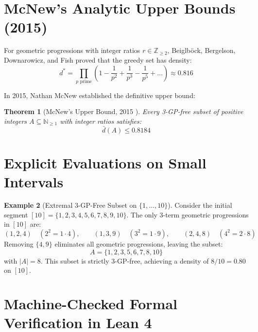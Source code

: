 \documentclass[11pt,a4paper]{article}
\newtheorem{theorem}{Theorem}[section]
\theoremstyle{definition}
\newtheorem{example}[theorem]{Example}
\begin{document}
\section{McNew's Analytic Upper Bounds (2015)}

For geometric progressions with integer ratios $r \in \mathbb{Z}_{\ge 2}$, Beiglb\"ock, Bergelson, Downarowicz, and Fish \cite{beiglbock2010} proved that the greedy set has density:
\[ d^* = \prod_{p \text{ prime}} \left( 1 - \frac{1}{p^2} + \frac{1}{p^3} - \frac{1}{p^5} + \dots \right) \approx 0.816 \]

In 2015, Nathan McNew \cite{mcnew2015} established the definitive upper bound:

\begin{theorem}[McNew's Upper Bound, 2015 \cite{mcnew2015}]\label{thm:mcnew_bound}
Every 3-GP-free subset of positive integers $A \subseteq \mathbb{N}_{\ge 1}$ with integer ratios satisfies:
\begin{equation}\label{eq:mcnew_density}
\bar{d}(A) \le 0.8184
\end{equation}
\end{theorem}

\section{Explicit Evaluations on Small Intervals}

\begin{example}[Extremal 3-GP-Free Subset on $\{1, \dots, 10\}$]\label{ex:small_gp_free}
Consider the initial segment $[10] = \{1, 2, 3, 4, 5, 6, 7, 8, 9, 10\}$.
The only 3-term geometric progressions in $[10]$ are:
\[ (1, 2, 4) \quad (2^2 = 1 \cdot 4), \qquad (1, 3, 9) \quad (3^2 = 1 \cdot 9), \qquad (2, 4, 8) \quad (4^2 = 2 \cdot 8) \]
Removing $\{4, 9\}$ eliminates all geometric progressions, leaving the subset:
\[ A = \{1, 2, 3, 5, 6, 7, 8, 10\} \]
with $|A| = 8$. This subset is strictly 3-GP-free, achieving a density of $8/10 = 0.80$ on $[10]$.
\end{example}

\section{Machine-Checked Formal Verification in Lean 4}
\end{document}
